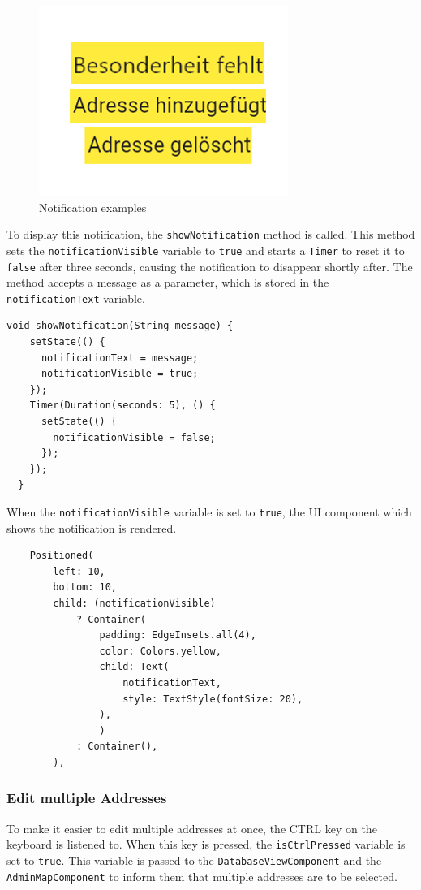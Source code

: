 \begin{figure}[H]
    \centering
    \includegraphics[width=0.4\linewidth]{images/AdminPanel/NotificationExamples.png}
    \caption{Notification examples}
\end{figure}

To display this notification, the \texttt{showNotification} method is called. This method sets the \texttt{notificationVisible} variable to \texttt{true} and starts a \texttt{Timer} to reset it to \texttt{false} after three seconds, causing the notification to disappear shortly after. The method accepts a message as a parameter, which is stored in the \texttt{notificationText} variable.
\lstset{style=mycsharp, caption=showNotification method}
\begin{lstlisting}
void showNotification(String message) {
    setState(() {
      notificationText = message;
      notificationVisible = true;
    }); 
    Timer(Duration(seconds: 5), () {
      setState(() {
        notificationVisible = false;
      });
    });
  }
\end{lstlisting}

When the \texttt{notificationVisible} variable is set to \texttt{true}, the UI component which shows the notification is rendered.
\lstset{style=mycsharp, caption=Notification in AddressPage}
\begin{lstlisting}
    Positioned(
        left: 10,
        bottom: 10,
        child: (notificationVisible)
            ? Container(
                padding: EdgeInsets.all(4),
                color: Colors.yellow,
                child: Text(
                    notificationText,
                    style: TextStyle(fontSize: 20),
                ),
                )
            : Container(),
        ),
\end{lstlisting}

\subsubsection{Edit multiple Addresses}
\label{fig:Edit multiple addresses}
To make it easier to edit multiple addresses at once, the CTRL key on the keyboard is listened to. When this key is pressed, the \texttt{isCtrlPressed} variable is set to \texttt{true}. This variable is passed to the \texttt{DatabaseViewComponent} and the \texttt{AdminMapComponent} to inform them that multiple addresses are to be selected.\\

